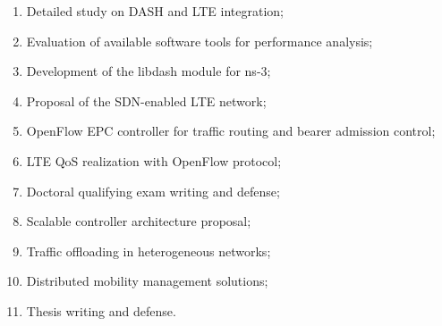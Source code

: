 \begin{enumerate}
	\itemsep0pt
  \item Detailed study on \ac{DASH} and \ac{LTE} integration;
  \item Evaluation of available software tools for performance analysis;
  \item Development of the libdash module for \ac{ns-3};
  \item Proposal of the \ac{SDN}-enabled \ac{LTE} network;
  \item OpenFlow \ac{EPC} controller for traffic routing and bearer admission
        control;
  \item \ac{LTE} \ac{QoS} realization with OpenFlow protocol;
  \item Doctoral qualifying exam writing and defense;
  \item Scalable controller architecture proposal;
  \item Traffic offloading in heterogeneous networks;
  \item Distributed mobility management solutions;
  \item Thesis writing and defense.
\end{enumerate}


